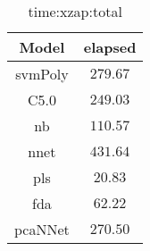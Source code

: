\begin{table}[!ht]
	\centering
	\begin{tabular}{|c|c|}
		\hline
		Model & elapsed \\ \hline
		svmPoly & $279.67$ \\ \hline
		C5.0 & $249.03$ \\ \hline
		nb & $110.57$ \\ \hline
		nnet & $431.64$ \\ \hline
		pls & $20.83$ \\ \hline
		fda & $62.22$ \\ \hline
		pcaNNet & $270.50$ \\ \hline
	\end{tabular}
	\caption{time:xzap:total}
	\label{tab:time:xzap:total}
\end{table}
